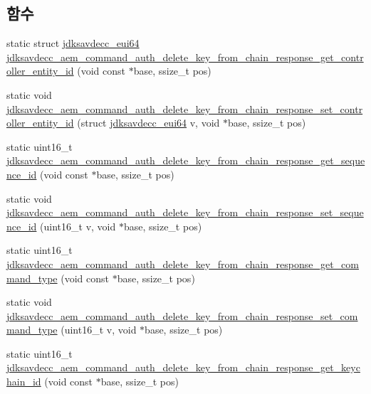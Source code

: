 \subsection*{함수}
\begin{DoxyCompactItemize}
\item 
static struct \hyperlink{structjdksavdecc__eui64}{jdksavdecc\+\_\+eui64} \hyperlink{group__command__auth__delete__key__from__chain__response_gad26fae65d0a7ead5dfbeadcd62e0b11d}{jdksavdecc\+\_\+aem\+\_\+command\+\_\+auth\+\_\+delete\+\_\+key\+\_\+from\+\_\+chain\+\_\+response\+\_\+get\+\_\+controller\+\_\+entity\+\_\+id} (void const $\ast$base, ssize\+\_\+t pos)
\item 
static void \hyperlink{group__command__auth__delete__key__from__chain__response_ga356ecde262cf7ace0021fca0c6430c0e}{jdksavdecc\+\_\+aem\+\_\+command\+\_\+auth\+\_\+delete\+\_\+key\+\_\+from\+\_\+chain\+\_\+response\+\_\+set\+\_\+controller\+\_\+entity\+\_\+id} (struct \hyperlink{structjdksavdecc__eui64}{jdksavdecc\+\_\+eui64} v, void $\ast$base, ssize\+\_\+t pos)
\item 
static uint16\+\_\+t \hyperlink{group__command__auth__delete__key__from__chain__response_gad2d0ec40a85370c208d61be956af9816}{jdksavdecc\+\_\+aem\+\_\+command\+\_\+auth\+\_\+delete\+\_\+key\+\_\+from\+\_\+chain\+\_\+response\+\_\+get\+\_\+sequence\+\_\+id} (void const $\ast$base, ssize\+\_\+t pos)
\item 
static void \hyperlink{group__command__auth__delete__key__from__chain__response_ga0b2dfc43532d6f32eb429447d46ccf33}{jdksavdecc\+\_\+aem\+\_\+command\+\_\+auth\+\_\+delete\+\_\+key\+\_\+from\+\_\+chain\+\_\+response\+\_\+set\+\_\+sequence\+\_\+id} (uint16\+\_\+t v, void $\ast$base, ssize\+\_\+t pos)
\item 
static uint16\+\_\+t \hyperlink{group__command__auth__delete__key__from__chain__response_ga8a309053585a67255da3c748b330f2e5}{jdksavdecc\+\_\+aem\+\_\+command\+\_\+auth\+\_\+delete\+\_\+key\+\_\+from\+\_\+chain\+\_\+response\+\_\+get\+\_\+command\+\_\+type} (void const $\ast$base, ssize\+\_\+t pos)
\item 
static void \hyperlink{group__command__auth__delete__key__from__chain__response_ga475b0d5ccc58e768a06bd69b34f80d1d}{jdksavdecc\+\_\+aem\+\_\+command\+\_\+auth\+\_\+delete\+\_\+key\+\_\+from\+\_\+chain\+\_\+response\+\_\+set\+\_\+command\+\_\+type} (uint16\+\_\+t v, void $\ast$base, ssize\+\_\+t pos)
\item 
static uint16\+\_\+t \hyperlink{group__command__auth__delete__key__from__chain__response_gab222b1bc3f4d03164c7c4fd666247167}{jdksavdecc\+\_\+aem\+\_\+command\+\_\+auth\+\_\+delete\+\_\+key\+\_\+from\+\_\+chain\+\_\+response\+\_\+get\+\_\+keychain\+\_\+id} (void const $\ast$base, ssize\+\_\+t pos)

\end{DoxyCompactItemize}
